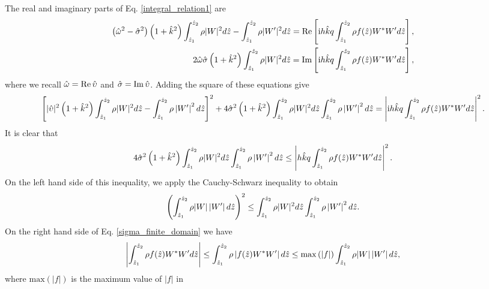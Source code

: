 The real and imaginary parts of 
Eq. \ref{integral_relation1} are
\begin{align}
  \left(\hat{\omega}^2-\hat{\sigma}^2\right)\left(1+\hat{k}^2\right) 
  \int_{\hat{z}_1}^{\hat{z}_2}\rho|W|^2d\hat{z} -
  \int_{\hat{z}_1}^{\hat{z}_2}\rho|W^\prime|^2d\hat{z}
  \notag
  =\operatorname{Re}\left[\mathrm{i}
    h\hat{k}q \int_{\hat{z}_1}^{\hat{z}_2}\rho
    f(\hat{z}) W^*W^\prime d\hat{z}\right], \\
   2\hat{\omega}\hat{\sigma}\left(1+\hat{k}^2\right)
  \int_{\hat{z}_1}^{\hat{z}_2}\rho|W|^2d\hat{z}
  =\operatorname{Im}\left[\mathrm{i}
    h\hat{k}q \int_{\hat{z}_1}^{\hat{z}_2}\rho
    f(\hat{z}) W^*W^\prime d\hat{z}\right],
\end{align}
where we recall $\hat{\omega} = \operatorname{Re} \hat{\upsilon}$ and
$\hat{\sigma}=\operatorname{Im}\hat{\upsilon}$. 
Adding the square of these equations give
\begin{align}
  \left[|\hat{\upsilon}|^2\left(1+\hat{k}^2\right)
    \int_{\hat{z}_1}^{\hat{z}_2}\rho|W|^2d\hat{z} -
    \int_{\hat{z}_1}^{\hat{z}_2}\rho\left|W^\prime \right|^2d\hat{z}\right]^2
  +4\hat{\sigma}^2\left(1+\hat{k}^2\right) 
  \int_{\hat{z}_1}^{\hat{z}_2}\rho
  |W|^2d\hat{z}\int_{\hat{z}_1}^{\hat{z}_2}\rho\left|W^\prime \right|^2d\hat{z}
  =\left|\mathrm{i}
    h\hat{k}q\int_{\hat{z}_1}^{\hat{z}_2}\rho
    f(\hat{z}) W^*W^\prime d\hat{z}\right|^2.
\end{align}
It is clear that
\begin{align}\label{sigma_finite_domain} 
  4\hat{\sigma}^2\left(1+\hat{k}^2\right) 
  \int_{\hat{z}_1}^{\hat{z}_2}\rho
  |W|^2d\hat{z}\int_{\hat{z}_1}^{\hat{z}_2}\rho\left|W^\prime
  \right|^2d\hat{z} 
  \leq\left|
    h\hat{k}q\int_{\hat{z}_1}^{\hat{z}_2}\rho
    f(\hat{z}) W^*W^\prime d\hat{z}\right|^2.
\end{align}
On the left hand side of this inequality, we apply the Cauchy-Schwarz
inequality to obtain
\begin{align}
  \left( \int_{\hat{z}_1}^{\hat{z}_2}\rho
    |W|\left|W^\prime \right|d\hat{z}\right)^2\leq
  \int_{\hat{z}_1}^{\hat{z}_2}\rho 
  |W|^2d\hat{z}\int_{\hat{z}_1}^{\hat{z}_2}\rho\left|W^\prime \right|^2d\hat{z}.
\end{align}
On the right hand side of Eq. \ref{sigma_finite_domain} we have
\begin{align}
  \left|\int_{\hat{z}_1}^{\hat{z}_2}\rho
    f(\hat{z}) W^*W^\prime d\hat{z}\right|\leq \int_{\hat{z}_1}^{\hat{z}_2}\rho
  \left|f(\hat{z})W^*W^\prime \right|d\hat{z}
  \leq
  \mathrm{max}\left(|f|\right)\int_{\hat{z}_1}^{\hat{z}_2}\rho
  |W|\left|W^\prime \right|d\hat{z},
\end{align}
where $\mathrm{max}(|f|)$ is the maximum value of $|f|$ in
